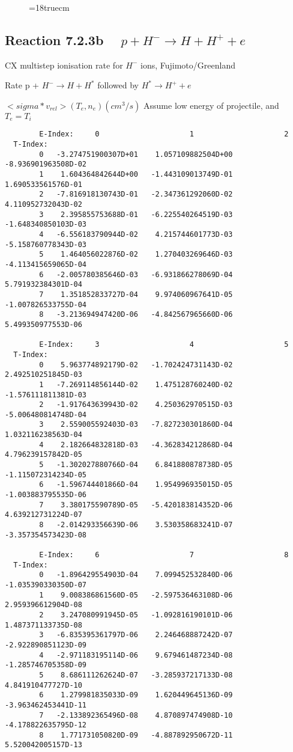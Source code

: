 \begin{figure} \label{7.2.3a}
\epsfxsize=18truecm
\end{figure}
\newpage

\subsection{
Reaction 7.2.3b   $\quad p + H^{-} \rightarrow  H + H^+ + e$
}

  CX multistep ionisation rate for $H^-$ ions,
  Fujimoto/Greenland

  Rate p + $H^- \rightarrow H + H^*$ followed by $H^* \rightarrow H^+
+e$

$ <sigma*v_{rel}>(T_e,n_e) (cm^3/s)$
Assume low energy of projectile, and $T_e = T_i$

\begin{verbatim}
        E-Index:     0                     1                     2
  T-Index:
        0   -3.274751900307D+01    1.057109882504D+00   -8.936901963508D-02
        1    1.604364842644D+00   -1.443109013749D-01    1.690533561576D-01
        2   -7.816918130743D-01   -2.347361292060D-02    4.110952732043D-02
        3    2.395855753688D-01   -6.225540264519D-03   -1.648340850103D-03
        4   -6.556183790944D-02    4.215744601773D-03   -5.158760778343D-03
        5    1.464056022876D-02    1.270403269646D-03   -4.113415659065D-04
        6   -2.005780385646D-03   -6.931866278069D-04    5.791932384301D-04
        7    1.351852833727D-04    9.974060967641D-05   -1.007826533755D-04
        8   -3.213694947420D-06   -4.842567965660D-06    5.499350977553D-06

        E-Index:     3                     4                     5
  T-Index:
        0    5.963774892179D-02   -1.702424731143D-02    2.492510251845D-03
        1   -7.269114856144D-02    1.475128760240D-02   -1.576111811381D-03
        2   -1.917643639943D-02    4.250362970515D-03   -5.006480814748D-04
        3    2.559005592403D-03   -7.827230301860D-04    1.032116238563D-04
        4    2.182664832818D-03   -4.362834212868D-04    4.796239157842D-05
        5   -1.302027880766D-04    6.841880878738D-05   -1.115072314234D-05
        6   -1.596744401866D-04    1.954996935015D-05   -1.003883795535D-06
        7    3.380175590789D-05   -5.420183814352D-06    4.639212731224D-07
        8   -2.014293356639D-06    3.530358683241D-07   -3.357354573423D-08

        E-Index:     6                     7                     8
  T-Index:
        0   -1.896429554903D-04    7.099452532840D-06   -1.035390330350D-07
        1    9.008386861560D-05   -2.597536463108D-06    2.959396612904D-08
        2    3.247080991945D-05   -1.092816190101D-06    1.487371133735D-08
        3   -6.835395361797D-06    2.246468887242D-07   -2.922890851123D-09
        4   -2.971183195114D-06    9.679461487234D-08   -1.285746705358D-09
        5    8.686111262624D-07   -3.285937217133D-08    4.841910477727D-10
        6    1.279981835033D-09    1.620449645136D-09   -3.963462453441D-11
        7   -2.133892365496D-08    4.870897474908D-10   -4.178822635795D-12
        8    1.771731050820D-09   -4.887892950672D-11    5.520042005157D-13


\end{verbatim}
